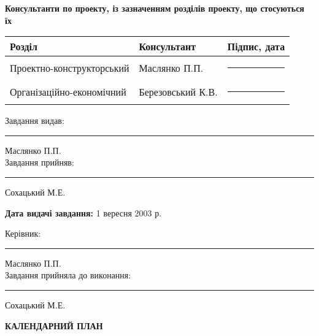 \documentclass{memoir}
\begin{document}
\begin{center}
    \textbf{Консультанти по проекту, із зазначенням розділів проекту, що стосуються їх}
\end{center}

\begin{tabular}{|>{\raggedright\arraybackslash}p{5cm}|>{\raggedright\arraybackslash}p{5cm}|>{\raggedright\arraybackslash}p{3cm}|}
    \hline
    \textbf{Розділ} & \textbf{Консультант} & \textbf{Підпис, дата} \\
    \hline
    Проектно-конструкторський & Маслянко П.П. & \rule{3cm}{0.4pt} \\
    \hline
    Організаційно-економічний & Березовський К.В. & \rule{3cm}{0.4pt} \\
    \hline
\end{tabular}

\vspace{0.5cm}

\begin{flushleft}
    Завдання видав: \rule{3cm}{0.4pt} Маслянко П.П. \\
    Завдання прийняв: \rule{3cm}{0.4pt} Сохацький М.Е.
\end{flushleft}

\vspace{0.5cm}

\begin{center}
    \textbf{Дата видачі завдання:} 1 вересня 2003 р.
\end{center}

\begin{flushleft}
    Керівник: \rule{3cm}{0.4pt} Маслянко П.П. \\
    Завдання прийняла до виконання: \rule{3cm}{0.4pt} Сохацький М.Е.
\end{flushleft}

\clearpage

\begin{center}
    {\large \textbf{КАЛЕНДАРНИЙ ПЛАН}}
\end{center}
\end{document}
